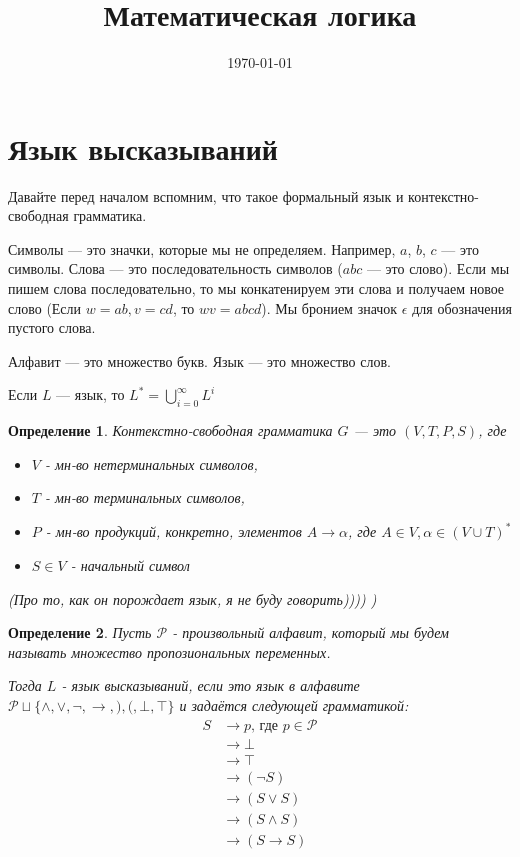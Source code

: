 \documentclass[12pt]{article}
\title{Математическая логика}
\date{\today}
\newtheorem{definition}{Определение}
\begin{document}
\maketitle
\section{Язык высказываний}

Давайте перед началом вспомним, что такое формальный язык и контекстно-свободная грамматика.

Символы --- это значки, которые мы не определяем. Например, $a$, $b$, $c$ --- это символы.
Слова --- это последовательность символов ($abc$ --- это слово). Если мы пишем слова последовательно, то мы конкатенируем эти слова и получаем новое слово (Если $w = ab, v = cd $, то $ wv = abcd$). Мы бронием значок $\epsilon$ для обозначения пустого слова.

Алфавит --- это множество букв. Язык --- это множество слов.

Если $L$ --- язык, то $L^* = \bigcup_{i=0}^\infty L^i$

\begin{definition}
	Контекстно-свободная грамматика $G$ --- это $(V,T,P,S)$, где
	\begin{itemize}
		\item $V$ - мн-во нетерминальных символов,
		\item $T$ - мн-во терминальных символов,
		\item $P$ - мн-во продукций, конкретно, элементов $A \longrightarrow \alpha$, где $A \in V, \alpha \in (V \cup T)^*$
		\item $S \in V$ -  начальный символ

	\end{itemize}
	(Про то, как он порождает язык, я не буду говорить)))) )
\end{definition}

\begin{definition}
	Пусть $\mathcal{P}$ - произвольный алфавит, который мы будем называть множество пропозиональных переменных.

	Тогда $L$ - язык высказываний, если это язык в алфавите $\mathcal{P} \sqcup \{\land, \lor, \lnot, \rightarrow, ), (, \bot, \top\}$ и задаётся следующей грамматикой:
	\begin{align*}
		S & \longrightarrow p \text{, где } p \in \mathcal{P} \\
		  & \longrightarrow \bot                              \\
		  & \longrightarrow \top                              \\
		  & \longrightarrow (\lnot S)                         \\
		  & \longrightarrow (S \lor S)                        \\
		  & \longrightarrow (S \land S)                       \\
		  & \longrightarrow (S \to S)                         \\
	\end{align*}
\end{definition}
\end{document}
